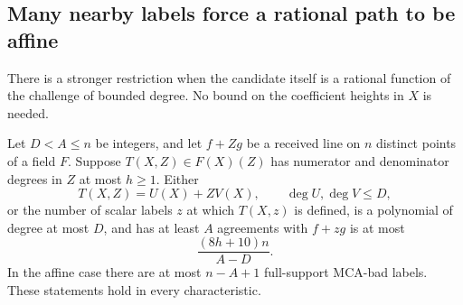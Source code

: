 \subsection{Many nearby labels force a rational path to be affine}
\label{sec:rational-path-rigidity}

There is a stronger restriction when the candidate itself is a rational
function of the challenge of bounded degree. No bound on the coefficient
heights in $X$ is needed.

\begin{theorem}
\label{thm:rational-path-rigidity}
Let $D<A\le n$ be integers, and let $f+Zg$ be a received line on $n$
distinct points of a field $F$. Suppose $T(X,Z)\in F(X)(Z)$ has numerator
and denominator degrees in $Z$ at most $h\ge1$. Either
\[
 T(X,Z)=U(X)+ZV(X),\qquad \deg U,\deg V\le D,
\]
or the number of scalar labels $z$ at which $T(X,z)$ is defined, is a
polynomial of degree at most $D$, and has at least $A$ agreements with
$f+zg$ is at most
\[
 \frac{(8h+10)n}{A-D}.
\]
In the affine case there are at most $n-A+1$ full-support MCA-bad labels.
These statements hold in every characteristic.
\end{theorem}

